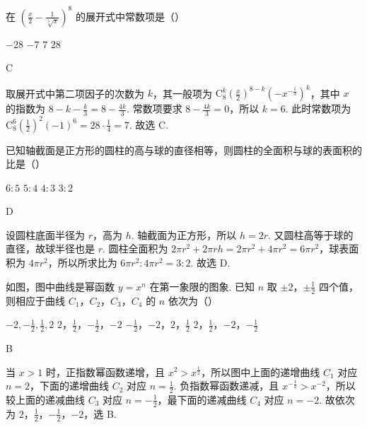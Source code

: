 \documentclass[UTF8,a4paper,oneside,11pt]{ctexbook}
\begin{document}
\begin{problem}
在 \(\left(\frac{x}{2}-\frac{1}{\sqrt[3]{x}}\right)^8\) 的展开式中常数项是（\quad）

\choices
    {\(-28\)}
    {\(-7\)}
    {\(7\)}
    {\(28\)}

\begin{answer}
C
\end{answer}

\begin{solution}
取展开式中第二项因子的次数为 \(k\)，其一般项为 \(\mathrm C_8^k\left(\frac{x}{2}\right)^{8-k}\left(-x^{-\frac{1}{3}}\right)^k\)，其中 \(x\) 的指数为 \(8-k-\frac{k}{3}=8-\frac{4k}{3}\). 常数项要求 \(8-\frac{4k}{3}=0\)，所以 \(k=6\). 此时常数项为 \(\mathrm C_8^6\left(\frac{1}{2}\right)^2(-1)^6=28\cdot\frac{1}{4}=7\). 故选 C.
\end{solution}
\end{problem}

\begin{problem}
已知轴截面是正方形的圆柱的高与球的直径相等，则圆柱的全面积与球的表面积的比是（\quad）

\choices
    {\(6:5\)}
    {\(5:4\)}
    {\(4:3\)}
    {\(3:2\)}

\begin{answer}
D
\end{answer}

\begin{solution}
设圆柱底面半径为 \(r\)，高为 \(h\). 轴截面为正方形，所以 \(h=2r\). 又圆柱高等于球的直径，故球半径也是 \(r\). 圆柱全面积为 \(2\pi r^2+2\pi rh=2\pi r^2+4\pi r^2=6\pi r^2\)，球表面积为 \(4\pi r^2\)，所以所求比为 \(6\pi r^2:4\pi r^2=3:2\). 故选 D.
\end{solution}
\end{problem}

\begin{problem}
如图，图中曲线是幂函数 \(y=x^n\) 在第一象限的图象. 已知 \(n\) 取 \(\pm 2\)，\(\pm \frac{1}{2}\) 四个值，则相应于曲线 \(C_{1}\)，\(C_{2}\)，\(C_{3}\)，\(C_{4}\) 的 \(n\) 依次为（\quad）


\choices
    {\(-2,-\frac{1}{2},\frac{1}{2},2\)}
    {\(2\)，\(\frac{1}{2}\)，\(-\frac{1}{2}\)，\(-2\)}
    {\(-\frac{1}{2}\)，\(-2\)，\(2\)，\(\frac{1}{2}\)}
    {\(2\)，\(\frac{1}{2}\)，\(-2\)，\(-\frac{1}{2}\)}

\begin{answer}
B
\end{answer}

\begin{solution}
当 \(x>1\) 时，正指数幂函数递增，且 \(x^2>x^{\frac{1}{2}}\)，所以图中上面的递增曲线 \(C_1\) 对应 \(n=2\)，下面的递增曲线 \(C_2\) 对应 \(n=\frac{1}{2}\). 负指数幂函数递减，且 \(x^{-\frac{1}{2}}>x^{-2}\)，所以较上面的递减曲线 \(C_3\) 对应 \(n=-\frac{1}{2}\)，最下面的递减曲线 \(C_4\) 对应 \(n=-2\). 故依次为 \(2\)，\(\frac{1}{2}\)，\(-\frac{1}{2}\)，\(-2\)，选 B.
\end{solution}
\end{problem}
\end{document}
